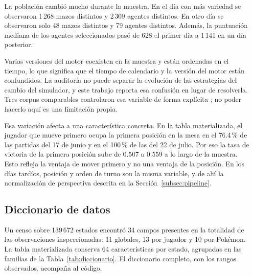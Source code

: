 La población cambió mucho durante la muestra. En el día con más variedad se
observaron 1\,268 mazos distintos y 2\,309 agentes distintos. En otro día
se observaron solo 48 mazos distintos y 79 agentes distintos. Además, la
puntuación mediana de los agentes seleccionados pasó de 628 el primer día a
1\,141 en un día posterior.

Varias versiones del motor coexisten en la muestra y están ordenadas en el
tiempo, lo que significa que el tiempo de calendario y la versión del motor
están confundidos. La auditoría no puede separar la evolución de las
estrategias del cambio del simulador, y este trabajo reporta esa confusión en
lugar de resolverla. Tres corpus comparables controlaron esa variable de
forma explícita
\cite{hodge_winprediction_2021,xenopoulos_winprob_2022,saravanan_metadiscovery_2024};
no poder hacerlo aquí es una limitación propia.

Esa variación afecta a una característica concreta. En
la tabla materializada, el jugador que mueve primero ocupa la primera
posición en la mesa en el 76.4\,\% de las partidas del 17 de junio y en el
100\,\% de las del 22 de julio. Por eso la tasa de victoria de la primera
posición sube de 0.507 a 0.559 a lo largo de la muestra. Esto refleja la ventaja
de mover primero y no una ventaja de la posición. En los días tardíos,
posición y orden de turno son la misma variable, y de ahí la normalización
de perspectiva descrita en la Sección~\ref{subsec:pipeline}.

\subsection{Diccionario de datos}
\label{subsec:diccionario}

Un censo sobre 139\,672 estados encontró 34 campos presentes en la totalidad
de las observaciones inspeccionadas: 11 globales, 13 por jugador y 10 por
Pok\'emon. La tabla materializada conserva 64 características por estado,
agrupadas en las familias de la Tabla~\ref{tab:diccionario}. El diccionario
completo, con los rangos observados, acompaña al código.

